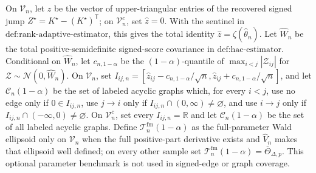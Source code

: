 On \(\mathcal V_n\), let \(\widehat z\) be the vector of upper-triangular entries of the recovered signed jump \(Z^\star=K^\star-(K^\star)^{\mathsf T}\); on \(\mathcal V_n^c\), set \(\widehat z=0\). With the sentinel in \(\text{def:rank-adaptive-estimator}\), this gives the total identity \(\widehat z=\zeta(\widehat\theta_n)\). Let \(\widehat W_n\) be the total positive-semidefinite signed-score covariance in \(\text{def:hac-estimator}\). Conditional on \(\widehat W_n\), let \(c_{n,1-\alpha}\) be the \((1-\alpha)\)-quantile of \(\max_{i<j}|\mathcal Z_{ij}|\) for \(\mathcal Z\sim\mathcal N(0,\widehat W_n)\). On \(\mathcal V_n\), set \(I_{ij,n}=[\widehat z_{ij}-c_{n,1-\alpha}/\sqrt n,\widehat z_{ij}+c_{n,1-\alpha}/\sqrt n]\), and let \(\mathcal C_n(1-\alpha)\) be the set of labeled acyclic graphs which, for every \(i<j\), use no edge only if \(0\in I_{ij,n}\), use \(j\to i\) only if \(I_{ij,n}\cap(0,\infty)\neq\varnothing\), and use \(i\to j\) only if \(I_{ij,n}\cap(-\infty,0)\neq\varnothing\). On \(\mathcal V_n^c\), set every \(I_{ij,n}=\mathbb R\) and let \(\mathcal C_n(1-\alpha)\) be the set of all labeled acyclic graphs. Define \(\mathcal T_n^{\mathrm{fm}}(1-\alpha)\) as the full-parameter Wald ellipsoid only on \(\mathcal V_n\) when the full positive-part derivative exists and \(\widehat V_n\) makes that ellipsoid well defined; on every other sample set \(\mathcal T_n^{\mathrm{fm}}(1-\alpha)=\overline\Theta_{\Delta,p}\). This optional parameter benchmark is not used in signed-edge or graph coverage.